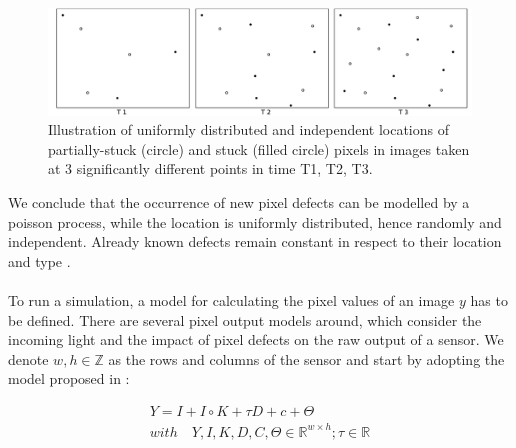 \documentclass[10pt,twocolumn,letterpaper]{article}
\begin{document}
\begin{figure}
\centering
\includegraphics[width=\textwidth]{img/defectLocations.png}
\caption{Illustration of uniformly distributed and independent locations of partially-stuck (circle) and stuck (filled circle) pixels in images taken at 3 significantly different points in time T1, T2, T3.}
\label{fig:defectLocations}
\end{figure}

We conclude that the occurrence of new pixel defects can be modelled by a poisson process, while the location is uniformly distributed, hence randomly and independent. Already known defects remain constant in respect to their location and type \cite{fridrich, defectIdentification}. \\
\\
To run a simulation, a model for calculating the pixel values of an image $y$ has to be defined. There are several pixel output models around, which consider the incoming light and the impact of pixel defects on the raw output of a sensor. We denote $w,h \in \mathbb{Z}$ as the rows and columns of the sensor and start by adopting the model proposed in \cite{fridrich}:

\begin{equation}
\begin{aligned}
 Y = I+I \circ K+\tau D +c+\Theta \\ with \quad Y,I,K,D,C, \Theta \in \mathbb{R}^{w \times h}; \tau \in \mathbb{R}
\end{aligned}
  \label{equ:pixelmodel}
 \end{equation}
\end{document}
